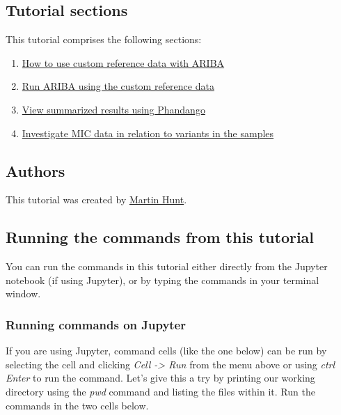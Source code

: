 \documentclass[11pt]{article}
\providecommand{\tightlist}{%
      \setlength{\itemsep}{0pt}\setlength{\parskip}{0pt}}
\begin{document}
\hypertarget{tutorial-sections}{%
\subsection{Tutorial sections}\label{tutorial-sections}}

This tutorial comprises the following sections:

\begin{enumerate}
\def\labelenumi{\arabic{enumi}.}
\tightlist
\item
  \href{make_custom_db.ipynb}{How to use custom reference data with
  ARIBA}
\item
  \href{run_ariba.ipynb}{Run ARIBA using the custom reference data}
\item
  \href{phandango.ipynb}{View summarized results using Phandango}
\item
  \href{micplot.ipynb}{Investigate MIC data in relation to variants in
  the samples}
\end{enumerate}

\hypertarget{authors}{%
\subsection{Authors}\label{authors}}

This tutorial was created by
\href{https://github.com/martinghunt}{Martin Hunt}.

\hypertarget{running-the-commands-from-this-tutorial}{%
\subsection{Running the commands from this
tutorial}\label{running-the-commands-from-this-tutorial}}

You can run the commands in this tutorial either directly from the
Jupyter notebook (if using Jupyter), or by typing the commands in your
terminal window.

\hypertarget{running-commands-on-jupyter}{%
\subsubsection{Running commands on
Jupyter}\label{running-commands-on-jupyter}}

If you are using Jupyter, command cells (like the one below) can be run
by selecting the cell and clicking \textit{Cell -\textgreater{} Run} from
the menu above or using \textit{ctrl Enter} to run the command. Let's give
this a try by printing our working directory using the \textit{pwd}
command and listing the files within it. Run the commands in the two
cells below.
\end{document}
